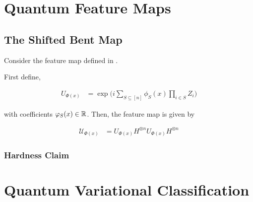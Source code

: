 \documentclass[main.tex]{subfiles}
\begin{document}
\section{Quantum Feature Maps}

\subsection{The Shifted Bent Map}

Consider the feature map defined in \cite{havlicek2018supervised}.

First define,

\begin{align*}
U_{\Phi(x)} &= \exp\Big(i \sum_{S \subseteq [n]} \phi_S(x) \prod_{i \in S} Z_i \Big)	
\end{align*}

with coefficients $\varphi_S(x) \in \mathbb{R}$. Then, the feature map is given by 


\begin{align}
\label{feat-map:hav}
\mathcal{U}_{\Phi(x)} &= U_{\Phi(x)} H^{\otimes n} U_{\Phi(x)} H^{\otimes n}
\end{align}


\subsubsection{Hardness Claim}

\section{Quantum Variational Classification}

%
%
%
\end{document}
